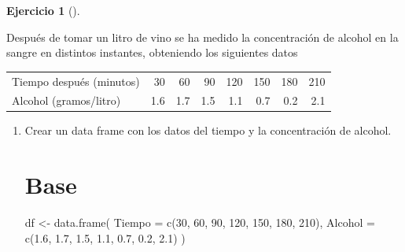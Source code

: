 \documentclass[
  a4paper,
]{scrreport}
\newenvironment{Shaded}{\begin{snugshade}}{\end{snugshade}}
\newcommand{\AttributeTok}[1]{\textcolor[rgb]{0.40,0.45,0.13}{#1}}
\newcommand{\DecValTok}[1]{\textcolor[rgb]{0.68,0.00,0.00}{#1}}
\newcommand{\FloatTok}[1]{\textcolor[rgb]{0.68,0.00,0.00}{#1}}
\newcommand{\FunctionTok}[1]{\textcolor[rgb]{0.28,0.35,0.67}{#1}}
\newcommand{\NormalTok}[1]{\textcolor[rgb]{0.00,0.23,0.31}{#1}}
\newcommand{\OtherTok}[1]{\textcolor[rgb]{0.00,0.23,0.31}{#1}}
\theoremstyle{definition}
\newtheorem{exercise}{Ejercicio}[chapter]
\theoremstyle{remark}
\begin{document}
\begin{exercise}[]\protect\hypertarget{exr-regresion-3}{}\label{exr-regresion-3}

Después de tomar un litro de vino se ha medido la concentración de
alcohol en la sangre en distintos instantes, obteniendo los siguientes
datos

\begin{longtable}[]{@{}lrrrrrrr@{}}
\toprule\noalign{}
\endhead
\bottomrule\noalign{}
\endlastfoot
Tiempo después (minutos) & 30 & 60 & 90 & 120 & 150 & 180 & 210 \\
Alcohol (gramos/litro) & 1.6 & 1.7 & 1.5 & 1.1 & 0.7 & 0.2 & 2.1 \\
\end{longtable}

\begin{enumerate}
\def\labelenumi{\alph{enumi}.}
\item
  Crear un data frame con los datos del tiempo y la concentración de
  alcohol.

  \begin{tcolorbox}[enhanced jigsaw, colframe=quarto-callout-tip-color-frame, toprule=.15mm, bottomtitle=1mm, breakable, opacitybacktitle=0.6, toptitle=1mm, colback=white, bottomrule=.15mm, title=\textcolor{quarto-callout-tip-color}{\faLightbulb}\hspace{0.5em}{Solución}, arc=.35mm, left=2mm, titlerule=0mm, rightrule=.15mm, coltitle=black, leftrule=.75mm, opacityback=0, colbacktitle=quarto-callout-tip-color!10!white]

  \section{Base}

\begin{Shaded}
\begin{Highlighting}[]
\NormalTok{df }\OtherTok{\textless{}{-}} \FunctionTok{data.frame}\NormalTok{(}
    \AttributeTok{Tiempo =} \FunctionTok{c}\NormalTok{(}\DecValTok{30}\NormalTok{, }\DecValTok{60}\NormalTok{, }\DecValTok{90}\NormalTok{, }\DecValTok{120}\NormalTok{, }\DecValTok{150}\NormalTok{, }\DecValTok{180}\NormalTok{, }\DecValTok{210}\NormalTok{),}
    \AttributeTok{Alcohol =} \FunctionTok{c}\NormalTok{(}\FloatTok{1.6}\NormalTok{, }\FloatTok{1.7}\NormalTok{, }\FloatTok{1.5}\NormalTok{, }\FloatTok{1.1}\NormalTok{, }\FloatTok{0.7}\NormalTok{, }\FloatTok{0.2}\NormalTok{, }\FloatTok{2.1}\NormalTok{)}
\NormalTok{)}
\end{Highlighting}
\end{Shaded}


\end{tcolorbox}
\end{enumerate}
\end{exercise}
\end{document}
